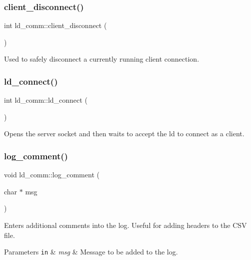 \subsubsection{\texorpdfstring{client\+\_\+disconnect()}{client\_disconnect()}}
{\footnotesize\ttfamily int ld\+\_\+comm\+::client\+\_\+disconnect (\begin{DoxyParamCaption}{ }\end{DoxyParamCaption})}

Used to safely disconnect a currently running client connection. \mbox{\label{classld__comm_a8cd32085a2ad22929e381ffce3fed103}} 
\subsubsection{\texorpdfstring{ld\+\_\+connect()}{ld\_connect()}}
{\footnotesize\ttfamily int ld\+\_\+comm\+::ld\+\_\+connect (\begin{DoxyParamCaption}{ }\end{DoxyParamCaption})}

Opens the server socket and then waits to accept the ld to connect as a client. \mbox{\label{classld__comm_ad47e957c7397e42e82128ee143d8b143}} 
\subsubsection{\texorpdfstring{log\+\_\+comment()}{log\_comment()}}
{\footnotesize\ttfamily void ld\+\_\+comm\+::log\+\_\+comment (\begin{DoxyParamCaption}\item[{char $\ast$}]{msg }\end{DoxyParamCaption})}

Enters additional comments into the log. Useful for adding headers to the C\+SV file. 
\begin{DoxyParams}[1]{Parameters}
\mbox{\tt in}  & {\em msg} & Message to be added to the log. \\
\hline
\end{DoxyParams}
\mbox{\label{classld__comm_a1219ef460b9a510a448704f57ce0412e}} 
